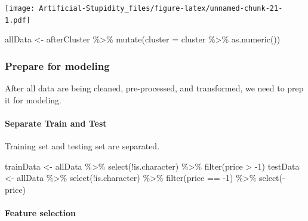 \documentclass[
]{article}
\newenvironment{Shaded}{\begin{snugshade}}{\end{snugshade}}
\newcommand{\AttributeTok}[1]{\textcolor[rgb]{0.77,0.63,0.00}{#1}}
\newcommand{\DecValTok}[1]{\textcolor[rgb]{0.00,0.00,0.81}{#1}}
\newcommand{\FunctionTok}[1]{\textcolor[rgb]{0.00,0.00,0.00}{#1}}
\newcommand{\NormalTok}[1]{#1}
\newcommand{\OtherTok}[1]{\textcolor[rgb]{0.56,0.35,0.01}{#1}}
\newcommand{\SpecialCharTok}[1]{\textcolor[rgb]{0.00,0.00,0.00}{#1}}
\begin{document}
\texttt{[image: Artificial-Stupidity\_files/figure-latex/unnamed-chunk-21-1.pdf]}

\begin{Shaded}
\begin{Highlighting}[]
\NormalTok{allData }\OtherTok{\textless{}{-}}\NormalTok{ afterCluster }\SpecialCharTok{\%\textgreater{}\%} \FunctionTok{mutate}\NormalTok{(}\AttributeTok{cluster =}\NormalTok{ cluster }\SpecialCharTok{\%\textgreater{}\%} \FunctionTok{as.numeric}\NormalTok{())}
\end{Highlighting}
\end{Shaded}

\hypertarget{prepare-for-modeling}{%
\subsubsection{Prepare for modeling}\label{prepare-for-modeling}}

After all data are being cleaned, pre-processed, and transformed, we
need to prep it for modeling.

\hypertarget{separate-train-and-test}{%
\paragraph{Separate Train and Test}\label{separate-train-and-test}}

Training set and testing set are separated.

\begin{Shaded}
\begin{Highlighting}[]
\NormalTok{trainData }\OtherTok{\textless{}{-}}\NormalTok{ allData }\SpecialCharTok{\%\textgreater{}\%}
    \FunctionTok{select}\NormalTok{(}\SpecialCharTok{!}\NormalTok{is.character) }\SpecialCharTok{\%\textgreater{}\%} 
    \FunctionTok{filter}\NormalTok{(price }\SpecialCharTok{\textgreater{}} \SpecialCharTok{{-}}\DecValTok{1}\NormalTok{) }
\NormalTok{testData }\OtherTok{\textless{}{-}}\NormalTok{ allData }\SpecialCharTok{\%\textgreater{}\%}
    \FunctionTok{select}\NormalTok{(}\SpecialCharTok{!}\NormalTok{is.character) }\SpecialCharTok{\%\textgreater{}\%} 
    \FunctionTok{filter}\NormalTok{(price }\SpecialCharTok{==} \SpecialCharTok{{-}}\DecValTok{1}\NormalTok{) }\SpecialCharTok{\%\textgreater{}\%} \FunctionTok{select}\NormalTok{(}\SpecialCharTok{{-}}\NormalTok{price)}
\end{Highlighting}
\end{Shaded}

\hypertarget{feature-selection}{%
\paragraph{Feature selection}\label{feature-selection}}
\end{document}
